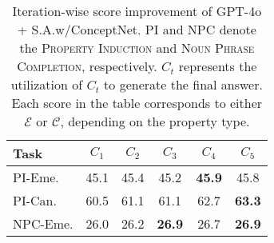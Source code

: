 \begin{table}[t!]
    \centering
    \begin{tabular}{lccccc}
        \toprule
        \textbf{Task} & $C_1$ & $C_2$ & $C_3$ & $C_4$ & $C_5$ \\
        \midrule
        PI-Eme. & 45.1 & 45.4 & 45.2 & \textbf{45.9} & 45.8 \\
        PI-Can. & 60.5 & 61.1 & 61.1 & 62.7 & \textbf{63.3} \\
        NPC-Eme. & 26.0 & 26.2 & \textbf{26.9} & 26.7 & \textbf{26.9} \\
        \bottomrule
    \end{tabular}
    \caption{Iteration-wise score improvement of GPT-4o + S.A.w/ConceptNet. PI and NPC denote the \textsc{Property Induction} and \textsc{Noun Phrase Completion}, respectively. \( C_t \) represents the utilization of \( C_t \) to generate the final answer. Each score in the table corresponds to either \( \mathcal{E} \) or \( \mathcal{C} \), depending on the property type.}
    \label{iteration_sa_filter}
\end{table}
